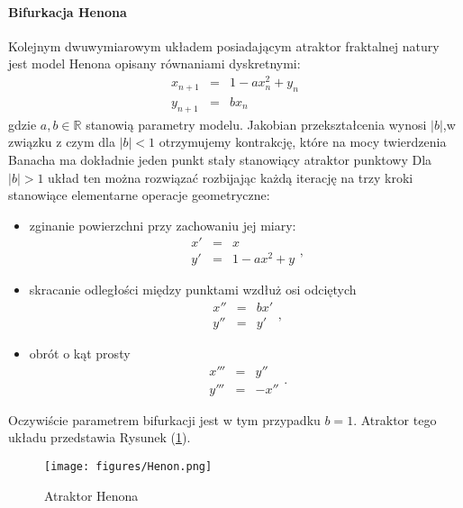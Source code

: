 \documentclass[12pt]{article}
\begin{document}
\paragraph{Bifurkacja Henona}
Kolejnym dwuwymiarowym układem posiadającym atraktor fraktalnej natury jest model Henona opisany równaniami dyskretnymi:
\begin{equation}
\begin{array}{rcl} 
x_{n+1} & = & 1-ax_{n}^2+y_{n} \\
y_{n+1} & = & bx_{n}
\end{array}
\end{equation}
gdzie $ a,b \in \mathbb{R} $ stanowią parametry modelu. Jakobian przekształcenia wynosi $ |b| $,w związku z czym dla $ |b|<1 $ otrzymujemy kontrakcję, które na mocy twierdzenia Banacha ma dokładnie jeden punkt stały stanowiący atraktor punktowy\newline
Dla $ |b|>1 $ układ ten można rozwiązać rozbijając każdą iterację na trzy kroki stanowiące elementarne operacje geometryczne:
\begin{itemize}
	\item zginanie powierzchni przy zachowaniu jej miary:
	\begin{equation}
	\begin{array}{rcl} 
	x' & = & x \\
	y' & = & 1-ax^{2}+y
	\end{array},
	\end{equation}
	\item skracanie odległości między punktami wzdłuż osi odciętych
	\begin{equation}
	\begin{array}{rcl} 
	x'' & = & bx' \\
	y'' & = & y'
	\end{array},
	\end{equation}
	\item obrót o kąt prosty
	\begin{equation}
	\begin{array}{rcl} 
	x''' & = & y'' \\
	y''' & = & -x''
	\end{array}.
	\end{equation}
\end{itemize}
Oczywiście parametrem bifurkacji jest w tym przypadku $ b=1 $. Atraktor tego układu przedstawia Rysunek (\ref{Fig10}).
\begin{figure}[H]
	\texttt{[image: figures/Henon.png]} 
	\centering
	\caption{Atraktor Henona}
	\label{Fig10}
\end{figure}
\end{document}
